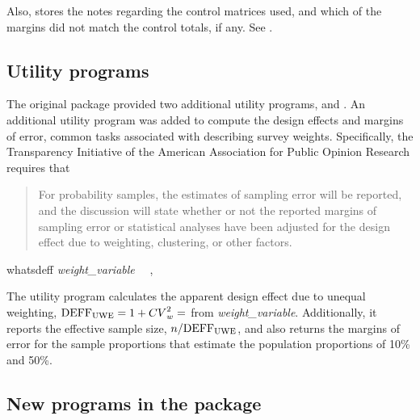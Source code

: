 Also,  stores the notes regarding the control matrices
used, and which of the margins did not match the control totals, if any.
See .

\subsection{Utility programs}
\label{subsec:utility}

The original package  provided two additional utility programs,
 and . An additional utility program  
was added to compute the design effects and margins of error, common tasks associated
with describing survey weights. Specifically, the Transparency Initiative
of the American Association for Public Opinion Research
\citep{aapor:2014:ti:terms}
requires that

\begin{quote}
For probability samples, the estimates of sampling error will be reported, and the discussion will state whether or not the reported margins of sampling error or statistical analyses have been adjusted for the design effect due to weighting, clustering, or other factors.
\end{quote}


\begin{stsyntax}
whatsdeff
{\it weight\_variable}
\optif\
\optin\
,
\end{stsyntax}

The utility program  calculates the apparent design effect due to unequal weighting,
${\rm DEFF_{UWE}}=1 + {CV}^2_w = $  from  {\it weight{\_}variable}.
Additionally, it reports the effective sample size, $n/{\rm DEFF_{UWE}}$, and also returns
the margins of error for the sample proportions that estimate the population proportions of
10\% and 50\%.

\noindent
\begin{stlog}
\nullskip
\end{stlog}

\subsection{New programs in the package}

